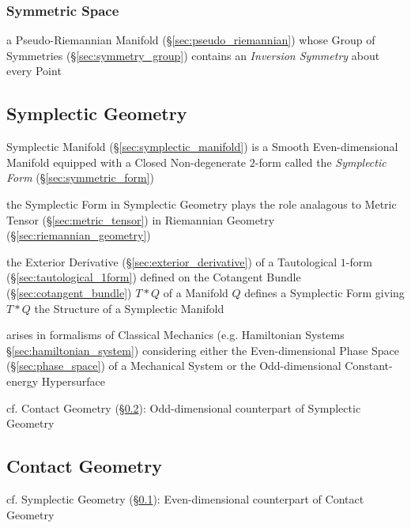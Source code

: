 \subsubsection{Symmetric Space}\label{sec:symmetric_space}

a Pseudo-Riemannian Manifold (\S\ref{sec:pseudo_riemannian}) whose Group of
Symmetries (\S\ref{sec:symmetry_group}) contains an \emph{Inversion Symmetry}
about every Point



\subsection{Symplectic Geometry}\label{sec:symplectic_geometry}

Symplectic Manifold (\S\ref{sec:symplectic_manifold}) is a Smooth
Even-dimensional Manifold equipped with a Closed Non-degenerate $2$-form called
the \emph{Symplectic Form} (\S\ref{sec:symmetric_form})

the Symplectic Form in Symplectic Geometry plays the role analagous to Metric
Tensor (\S\ref{sec:metric_tensor}) in Riemannian Geometry
(\S\ref{sec:riemannian_geometry})

the Exterior Derivative (\S\ref{sec:exterior_derivative}) of a Tautological
$1$-form (\S\ref{sec:tautological_1form}) defined on the Cotangent Bundle
(\S\ref{sec:cotangent_bundle}) $T * Q$ of a Manifold $Q$ defines a Symplectic
Form giving $T * Q$ the Structure of a Symplectic Manifold

arises in formalisms of Classical Mechanics (e.g. Hamiltonian Systems
\S\ref{sec:hamiltonian_system}) considering either the Even-dimensional Phase
Space (\S\ref{sec:phase_space}) of a Mechanical System or the Odd-dimensional
Constant-energy Hypersurface

\fist cf. Contact Geometry (\S\ref{sec:contact_geometry}): Odd-dimensional
counterpart of Symplectic Geometry



\subsection{Contact Geometry}\label{sec:contact_geometry}

\fist cf. Symplectic Geometry (\S\ref{sec:symplectic_geometry}):
Even-dimensional counterpart of Contact Geometry

